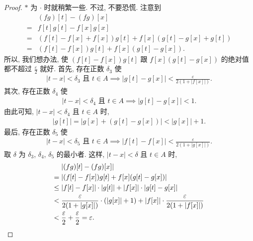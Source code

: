 \begin{proof}
    $\ast$ 为 $\cdot$ 时就稍繁一些.
    不过, 不要恐慌.
    注意到
    \begin{align*}
             & (fg)[t] - (fg)[x]                                   \\
        = {} & f[t]g[t] - f[x]g[x]                                 \\
        = {} & (f[t] - f[x] + f[x])g[t] + f[x](g[t] - g[x] + g[t]) \\
        = {} & (f[t] - f[x])g[t] + f[x](g[t] - g[x]).
    \end{align*}
    所以, 我们想办法, 使
    $(f[t] - f[x])g[t]$
    跟
    $f[x](g[t] - g[x])$
    的绝对值都不超过 $\frac{\varepsilon}{2}$ 就好.
    首先, 存在正数 $\delta_3$ 使
    \begin{align*}
        \text{$|t - x| < \delta_3$ 且 $t \in A$} \implies |g[t] - g[x]| < \frac{\varepsilon}{2(1 + |f[x]|)}.
    \end{align*}
    其次, 存在正数 $\delta_4$ 使
    \begin{align*}
        \text{$|t - x| < \delta_4$ 且 $t \in A$} \implies |g[t] - g[x]| < 1.
    \end{align*}
    由此可知, $|t - x| < \delta_4$ 且 $t \in A$ 时,
    \begin{align*}
        |g[t]| = |g[x] + (g[t] - g[x])| < |g[x]| + 1.
    \end{align*}
    最后, 存在正数 $\delta_5$ 使
    \begin{align*}
        \text{$|t - x| < \delta_5$ 且 $t \in A$} \implies |f[t] - f[x]| < \frac{\varepsilon}{2(1 + |g[x]|)}.
    \end{align*}
    取 $\delta$ 为
    $\delta_3$, $\delta_4$, $\delta_5$ 的最小者.
    这样, $|t - x| < \delta$ 且 $t \in A$ 时,
    \begin{align*}
                & |(fg)[t] - (fg)[x]|                                                                                   \\
        = {}    & |(f[t] - f[x])g[t] + f[x](g[t] - g[x])|                                                               \\
        \leq {} & |f[t] - f[x]| \cdot |g[t]| + |f[x]| \cdot |g[t] - g[x]|                                               \\
        < {}    & \frac{\varepsilon}{2(1 + |g[x]|)} \cdot (|g[x]| + 1) + |f[x]| \cdot \frac{\varepsilon}{2(1 + |f[x]|)} \\
        < {}    & \frac{\varepsilon}{2} + \frac{\varepsilon}{2} = \varepsilon. \qedhere
    \end{align*}
\end{proof}

